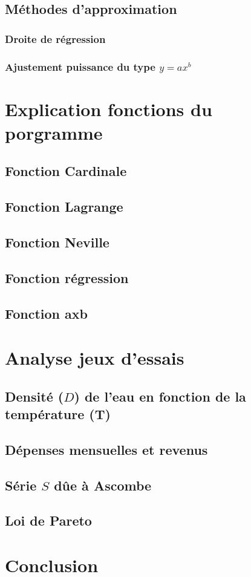 \documentclass[12pt,french,titlepage]{article}
\begin{document}
	\subsection{Méthodes d'approximation}
	
	\subsubsection{Droite de régression}
	
	\subsubsection{Ajustement puissance du type $y = ax^b$}
	
	\section{Explication fonctions du porgramme}
	
	\subsection{Fonction Cardinale}
	
	\subsection{Fonction Lagrange}
	
	\subsection{Fonction Neville}
	
	\subsection{Fonction régression}
	
	\subsection{Fonction axb}
	
	\section{Analyse jeux d'essais}
	
	\subsection{Densité ($D$) de l'eau en fonction de la température (T)}
	
	\subsection{Dépenses mensuelles et revenus}
	
	\subsection{Série $S$ dûe à Ascombe}
	
	\subsection{Loi de Pareto}
	
	\section{Conclusion}
	
	
	
\end{document}
